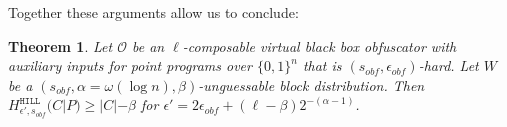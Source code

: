 \documentclass[11pt]{article}
\newcommand{\lemref}[1]{\mbox{Lemma~\ref{#1}}}
\DeclareMathOperator*{\expe}{\mathbb{E}}
\newcommand{\zo}{\ensuremath{\{0, 1\}}}
\newcommand{\hill}{\ensuremath{\mathtt{HILL}}\xspace}
\newcommand{\Hav}{\tilde{\mathrm{H}}_\infty}
\newtheorem{theorem}{Theorem}[section]
\newtheorem{lemma}[theorem]{Lemma}
\newtheorem{corollary}[theorem]{Corollary}
\begin{document}
\noindent Together these arguments allow us to conclude:
\begin{theorem}
\label{thm:security of cons}
Let $\mathcal{O}$ be an $\ell$-composable virtual black box obfuscator with auxiliary inputs for point programs over $\zo^n$ that is $(s_{obf}, \epsilon_{obf})$-hard.  Let $W$ be a $(s_{obf}, \alpha = \omega(\log n), \beta)$-unguessable block distribution.  Then $H^{\hill}_{\epsilon', s_{obf}}( C | P ) \geq |C| - \beta$ for $\epsilon' = 2\epsilon_{obf} + (\ell-\beta)2^{-(\alpha - 1)}$.
\end{theorem}


\end{document}
